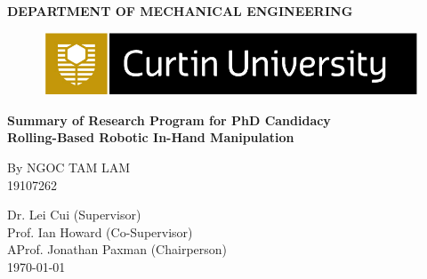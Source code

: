 \begin{titlepage}
\begin{center}
\vspace{1cm}
\large{\textbf{DEPARTMENT OF MECHANICAL ENGINEERING}}\\
\begin{figure}[h]
\includegraphics[width=\textwidth]{Curtinlogo}
\end{figure}

\hfill\break
\hfill\break
\Large{\textbf{Summary of Research Program for PhD Candidacy}}\\[1mm]
\vfill
\huge{\textbf{Rolling-Based Robotic In-Hand Manipulation}}\\[1mm]
\vfill

By NGOC TAM LAM\\
19107262\\
\vfill

Dr. Lei Cui (Supervisor)\\
Prof. Ian Howard (Co-Supervisor)\\
AProf. Jonathan Paxman (Chairperson)\\
\vfill
\today\\
\end{center}
\end{titlepage}
